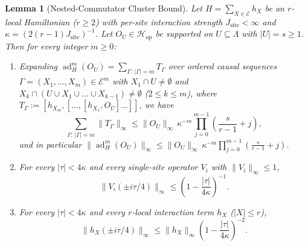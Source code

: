 \documentclass[11pt,a4paper]{article}
\numberwithin{equation}{section}
\theoremstyle{plain}
\newtheorem{lemma}[theorem]{Lemma}
\theoremstyle{definition}
\newcommand{\Hop}{\mathcal{H}_{\mathrm{op}}}
\newcommand{\ad}{\operatorname{ad}}
\begin{document}
\begin{lemma}[Nested-Commutator Cluster Bound]\label{lem:nested}
Let $H = \sum_{X\in\mathcal{E}} h_X$ be an $r$-local Hamiltonian ($r\ge 2$) with per-site interaction strength $J_{\mathrm{site}} < \infty$ and $\kappa = (2(r-1)J_{\mathrm{site}})^{-1}$. Let $O_U\in\Hop$ be supported on $U\subseteq\Lambda$ with $|U| = s \ge 1$. Then for every integer $m\ge 0$:
\begin{enumerate}
  \setlength{\itemsep}{2pt}\setlength{\parskip}{0pt}
  \item[\emph{(1)}] Expanding $\ad_H^m(O_U) = \sum_{\Gamma:\,|\Gamma|=m} T_\Gamma$ over ordered causal sequences $\Gamma = (X_1,\dots,X_m)\in\mathcal{E}^m$ with $X_1\cap U\ne\emptyset$ and $X_k\cap(U\cup X_1\cup\dots\cup X_{k-1})\ne\emptyset$ ($2\le k\le m$), where $T_\Gamma := [h_{X_m},[\dots,[h_{X_1},O_U]\dots]]$, we have
  \begin{equation}\label{eq:causal-norm-sum}
    \sum_{\Gamma:\,|\Gamma|=m}\|T_\Gamma\|_\infty \le \|O_U\|_\infty\,\kappa^{-m}\prod_{j=0}^{m-1}\left(\frac{s}{r-1}+j\right),
  \end{equation}
  and in particular $\|\ad_H^m(O_U)\|_\infty \le \|O_U\|_\infty\,\kappa^{-m}\prod_{j=0}^{m-1}(\frac{s}{r-1}+j)$.
  \item[\emph{(2)}] For every $|\tau| < 4\kappa$ and every single-site operator $V_i$ with $\|V_i\|_\infty \le 1$,
  \begin{equation}\label{eq:nested-Mbeta}
    \|V_i(\pm i\tau/4)\|_\infty \le \left(1 - \frac{|\tau|}{4\kappa}\right)^{-1}.
  \end{equation}
  \item[\emph{(3)}] For every $|\tau| < 4\kappa$ and every $r$-local interaction term $h_X$ ($|X|\le r$),
  \begin{equation}\label{eq:nested-hX}
    \|h_X(\pm i\tau/4)\|_\infty \le \|h_X\|_\infty\left(1 - \frac{|\tau|}{4\kappa}\right)^{-2}.
  \end{equation}
\end{enumerate}
\end{lemma}
\end{document}
